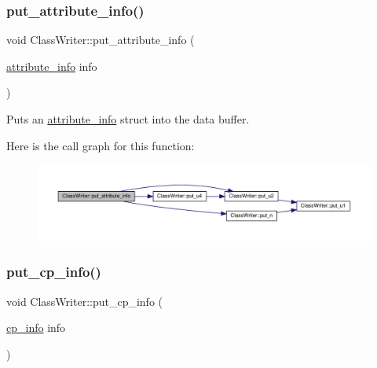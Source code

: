 \subsubsection{\texorpdfstring{put\+\_\+attribute\+\_\+info()}{put\_attribute\_info()}}
{\footnotesize\ttfamily void Class\+Writer\+::put\+\_\+attribute\+\_\+info (\begin{DoxyParamCaption}\item[{\hyperlink{structattribute__info}{attribute\+\_\+info}}]{info }\end{DoxyParamCaption})\hspace{0.3cm}{\ttfamily [private]}}



Puts an \hyperlink{structattribute__info}{attribute\+\_\+info} struct into the data buffer. 

Here is the call graph for this function\+:\nopagebreak
\begin{figure}[H]
\begin{center}
\leavevmode
\includegraphics[width=350pt]{classClassWriter_aeb256dbd55728dcc9081560691da779b_cgraph}
\end{center}
\end{figure}
\mbox{\label{classClassWriter_a47741e12ae2af256ce3a58a41b2d04d6}} 
\subsubsection{\texorpdfstring{put\+\_\+cp\+\_\+info()}{put\_cp\_info()}}
{\footnotesize\ttfamily void Class\+Writer\+::put\+\_\+cp\+\_\+info (\begin{DoxyParamCaption}\item[{\hyperlink{structcp__info}{cp\+\_\+info}}]{info }\end{DoxyParamCaption})\hspace{0.3cm}{\ttfamily [private]}}

